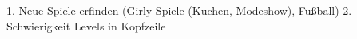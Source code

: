 1. Neue Spiele erfinden (Girly Spiele (Kuchen, Modeshow), Fußball)
2. Schwierigkeit Levels in Kopfzeile